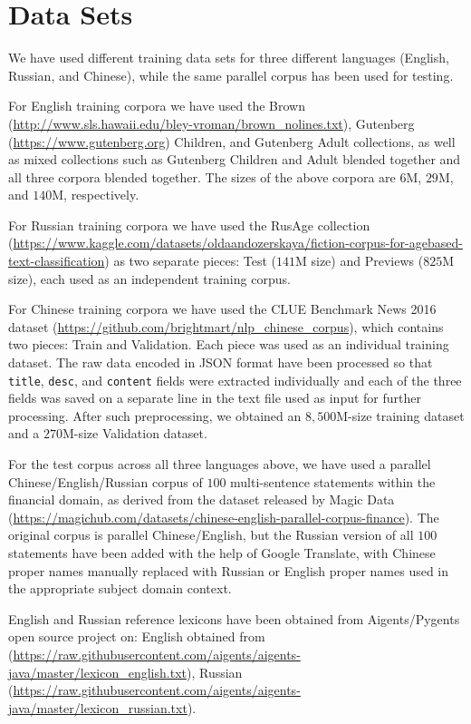 \documentclass[11pt]{article}
\begin{document}
\section{\label{data}Data Sets}

We have used different training data sets for three different languages (English, Russian, and Chinese), while the same parallel corpus has been used for testing.

For English training corpora we have used the Brown (\url{http://www.sls.hawaii.edu/bley-vroman/brown_nolines.txt}), Gutenberg (\url{https://www.gutenberg.org}) Children, and Gutenberg Adult collections, as well as mixed collections such as Gutenberg Children and Adult blended together and all three corpora blended together. The sizes of the above corpora are $6$M, $29$M, and $140$M, respectively. 

For Russian training corpora we have used the RusAge collection (\url{https://www.kaggle.com/datasets/oldaandozerskaya/fiction-corpus-for-agebased-text-classification}) as two separate pieces: Test ($141$M size) and Previews ($825$M size), each used as an independent training corpus.

For Chinese training corpora we have used the CLUE Benchmark News 2016 dataset (\url{https://github.com/brightmart/nlp_chinese_corpus}), which contains two pieces: Train and Validation. Each piece was used as an individual training dataset. The raw data encoded in JSON format have been processed so that \texttt{title}, \texttt{desc}, and \texttt{content} fields were extracted individually and each of the three fields was saved on a separate line in the text file used as input for further processing. After such preprocessing, we obtained an $8,500$M-size training dataset and a $270$M-size Validation dataset. 

For the test corpus across all three languages above, we have used a parallel Chinese/English/Russian corpus of $100$ multi-sentence statements within the financial domain, as derived from the dataset released by Magic Data (\url{https://magichub.com/datasets/chinese-english-parallel-corpus-finance}). The original corpus is parallel Chinese/English, but the Russian version of all $100$ statements have been added with the help of Google Translate, with Chinese proper names manually replaced with Russian or English proper names used in the appropriate subject domain context.

English and Russian reference lexicons have been obtained from Aigents/Pygents open source project on: English obtained from (\url{https://raw.githubusercontent.com/aigents/aigents-java/master/lexicon_english.txt}), Russian (\url{https://raw.githubusercontent.com/aigents/aigents-java/master/lexicon_russian.txt}).
\end{document}

